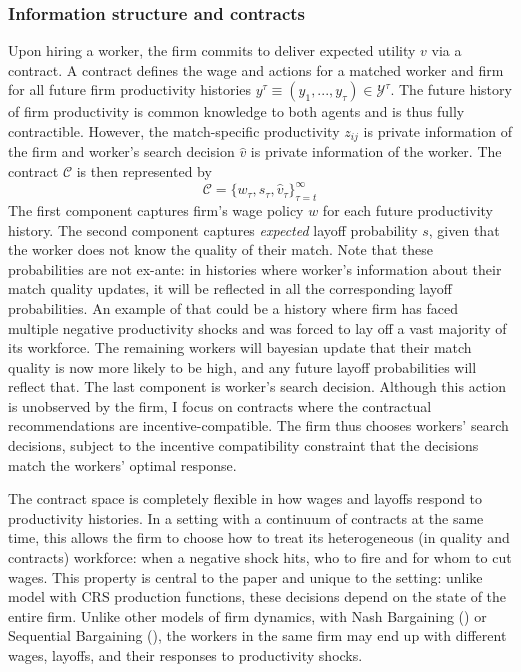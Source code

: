 \subsubsection*{Information structure and contracts}
Upon hiring a worker, the firm commits to deliver expected utility $v$ via a contract. A contract defines the wage and
actions for a matched worker and firm for all future firm productivity histories $y^\tau\equiv (y_1,...,y_\tau)\in \mathcal{Y}^{\tau}$. The future history of firm productivity is common knowledge to both agents and is thus fully contractible. However, the match-specific productivity $z_{ij}$ is private information of the firm and worker's search decision $\hat{v}$ is private information of the worker. The contract $\mathcal{C}$ is then represented by 
\begin{equation}
\mathcal{C}=\{w_{\tau},s_{\tau},\hat{v}_\tau\}_{\tau=t}^\infty
\end{equation}
The first component captures firm's wage policy $w$ for each future productivity history. The second component captures \textit{expected} layoff probability $s$, given that the worker does not know the quality of their match. Note that these probabilities are not ex-ante: in histories where worker's information about their match quality updates, it will be reflected in all the corresponding layoff probabilities. An example of that could be a history where firm has faced multiple negative productivity shocks and was forced to lay off a vast majority of its workforce. The remaining workers will bayesian update that their match quality is now more likely to be high, and any future layoff probabilities will reflect that. 
The last component is worker's search decision. Although this action is unobserved by the firm, I focus on contracts where the contractual recommendations are incentive-compatible. The firm thus chooses workers’ search decisions, subject to the incentive compatibility constraint that the decisions match the workers’ optimal response.

The contract space is completely flexible in how wages and layoffs respond to productivity histories. In a setting with a continuum of contracts at the same time, this allows the firm to choose how to treat its heterogeneous (in quality and contracts) workforce: when a negative shock hits, who to fire and for whom to cut wages. This property is central to the paper and unique to the setting: unlike model with CRS production functions, these decisions depend on the state of the entire firm. Unlike other models of firm dynamics, with Nash Bargaining (\textcite{mccrary2022}) or Sequential Bargaining (\textcite{bilal2022}), the workers in the same firm may end up with different wages, layoffs, and their responses to productivity shocks. %
